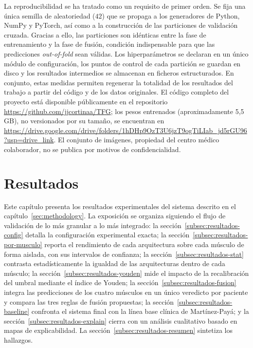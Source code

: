 \documentclass[12pt]{extarticle}
\numberwithin{equation}{section}
\begin{document}
\begin{refsection}
La reproducibilidad se ha tratado como un requisito de primer orden. Se fija una única semilla de aleatoriedad ($42$) que se propaga a los generadores de Python, NumPy y PyTorch, así como a la construcción de las particiones de validación cruzada. Gracias a ello, las particiones son idénticas entre la fase de entrenamiento y la fase de fusión, condición indispensable para que las predicciones \textit{out-of-fold} sean válidas. Los hiperparámetros se declaran en un único módulo de configuración, los puntos de control de cada partición se guardan en disco y los resultados intermedios se almacenan en ficheros estructurados. En conjunto, estas medidas permiten regenerar la totalidad de los resultados del trabajo a partir del código y de los datos originales. El código completo del proyecto está disponible públicamente en el repositorio \url{https://github.com/jjcortinaa/TFG}; los pesos entrenados (aproximadamente 5,5\,GB), no versionados por su tama\~no, se encuentran en \url{https://drive.google.com/drive/folders/1hDHp9OzT3U6jzT9ogTiLIab_jd5rGU96?usp=drive_link}. El conjunto de im\'agenes, propiedad del centro m\'edico colaborador, no se publica por motivos de confidencialidad.


\newpage

\section{Resultados}\label{sec:results}

Este capítulo presenta los resultados experimentales del sistema descrito en el capítulo~\ref{sec:methodology}. La exposición se organiza siguiendo el flujo de validación de lo más granular a lo más integrado: la sección~\ref{subsec:resultados-config} detalla la configuración experimental exacta; la sección~\ref{subsec:resultados-por-musculo} reporta el rendimiento de cada arquitectura sobre cada músculo de forma aislada, con sus intervalos de confianza; la sección~\ref{subsec:resultados-stat} contrasta estadísticamente la igualdad de las arquitecturas dentro de cada músculo; la sección~\ref{subsec:resultados-youden} mide el impacto de la recalibración del umbral mediante el índice de Youden; la sección~\ref{subsec:resultados-fusion} integra las predicciones de los cuatro músculos en un único veredicto por paciente y compara las tres reglas de fusión propuestas; la sección~\ref{subsec:resultados-baseline} confronta el sistema final con la línea base clínica de Martínez-Payá; y la sección~\ref{subsec:resultados-explain} cierra con un análisis cualitativo basado en mapas de explicabilidad. La sección~\ref{subsec:resultados-resumen} sintetiza los hallazgos.


\end{refsection}
\end{document}
